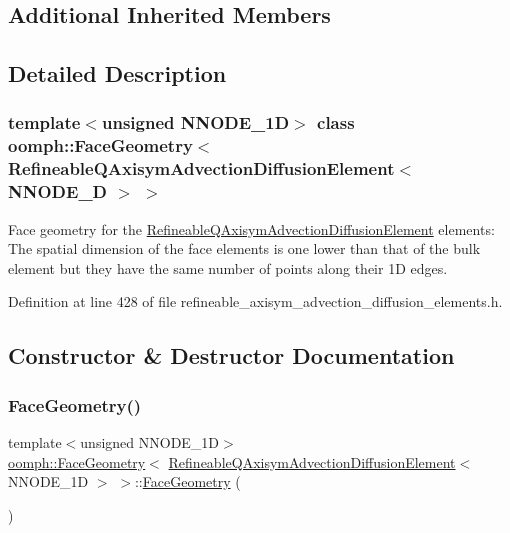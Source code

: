 \subsection*{Additional Inherited Members}


\subsection{Detailed Description}
\subsubsection*{template$<$unsigned N\+N\+O\+D\+E\+\_\+1D$>$\newline
class oomph\+::\+Face\+Geometry$<$ Refineable\+Q\+Axisym\+Advection\+Diffusion\+Element$<$ N\+N\+O\+D\+E\+\_\+D $>$ $>$}

Face geometry for the \hyperlink{classoomph_1_1RefineableQAxisymAdvectionDiffusionElement}{Refineable\+Q\+Axisym\+Advection\+Diffusion\+Element} elements\+: The spatial dimension of the face elements is one lower than that of the bulk element but they have the same number of points along their 1D edges. 

Definition at line 428 of file refineable\+\_\+axisym\+\_\+advection\+\_\+diffusion\+\_\+elements.\+h.



\subsection{Constructor \& Destructor Documentation}
\mbox{\label{classoomph_1_1FaceGeometry_3_01RefineableQAxisymAdvectionDiffusionElement_3_01NNODE__1D_01_4_01_4_a7a38fcc420a26f5dbffe3a18d1aec31e}} 
\subsubsection{\texorpdfstring{Face\+Geometry()}{FaceGeometry()}}
{\footnotesize\ttfamily template$<$unsigned N\+N\+O\+D\+E\+\_\+1D$>$ \\
\hyperlink{classoomph_1_1FaceGeometry}{oomph\+::\+Face\+Geometry}$<$ \hyperlink{classoomph_1_1RefineableQAxisymAdvectionDiffusionElement}{Refineable\+Q\+Axisym\+Advection\+Diffusion\+Element}$<$ N\+N\+O\+D\+E\+\_\+1D $>$ $>$\+::\hyperlink{classoomph_1_1FaceGeometry}{Face\+Geometry} (\begin{DoxyParamCaption}{ }\end{DoxyParamCaption})\hspace{0.3cm}{\ttfamily [inline]}}



